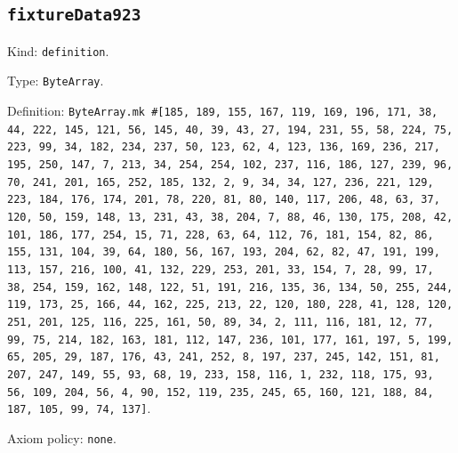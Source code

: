 \documentclass[11pt]{article}
\begin{document}
\subsection*{\texttt{fixtureData923}}
\noindent Kind: \texttt{definition}.\par
\noindent Type: \texttt{ByteArray}.\par
\noindent Definition: \texttt{ByteArray.mk \#[185, 189, 155, 167, 119, 169, 196, 171, 38, 44, 222, 145, 121, 56, 145, 40, 39, 43, 27, 194, 231, 55, 58, 224, 75, 223, 99, 34, 182, 234, 237, 50, 123, 62, 4, 123, 136, 169, 236, 217, 195, 250, 147, 7, 213, 34, 254, 254, 102, 237, 116, 186, 127, 239, 96, 70, 241, 201, 165, 252, 185, 132, 2, 9, 34, 34, 127, 236, 221, 129, 223, 184, 176, 174, 201, 78, 220, 81, 80, 140, 117, 206, 48, 63, 37, 120, 50, 159, 148, 13, 231, 43, 38, 204, 7, 88, 46, 130, 175, 208, 42, 101, 186, 177, 254, 15, 71, 228, 63, 64, 112, 76, 181, 154, 82, 86, 155, 131, 104, 39, 64, 180, 56, 167, 193, 204, 62, 82, 47, 191, 199, 113, 157, 216, 100, 41, 132, 229, 253, 201, 33, 154, 7, 28, 99, 17, 38, 254, 159, 162, 148, 122, 51, 191, 216, 135, 36, 134, 50, 255, 244, 119, 173, 25, 166, 44, 162, 225, 213, 22, 120, 180, 228, 41, 128, 120, 251, 201, 125, 116, 225, 161, 50, 89, 34, 2, 111, 116, 181, 12, 77, 99, 75, 214, 182, 163, 181, 112, 147, 236, 101, 177, 161, 197, 5, 199, 65, 205, 29, 187, 176, 43, 241, 252, 8, 197, 237, 245, 142, 151, 81, 207, 247, 149, 55, 93, 68, 19, 233, 158, 116, 1, 232, 118, 175, 93, 56, 109, 204, 56, 4, 90, 152, 119, 235, 245, 65, 160, 121, 188, 84, 187, 105, 99, 74, 137]}.\par
\noindent Axiom policy: \texttt{none}.\par
\end{document}

